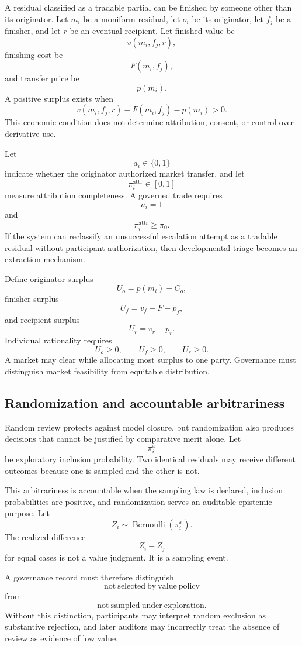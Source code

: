 \documentclass[11pt]{article}
\theoremstyle{definition}
\begin{document}
A residual classified as a tradable partial can be finished by someone other than its originator. Let \(m_i\) be a moniform residual, let \(o_i\) be its originator, let \(f_j\) be a finisher, and let \(r\) be an eventual recipient. Let finished value be
\[
v(m_i,f_j,r),
\]
finishing cost be
\[
F(m_i,f_j),
\]
and transfer price be
\[
p(m_i).
\]
A positive surplus exists when
\[
v(m_i,f_j,r)-F(m_i,f_j)-p(m_i)>0.
\]
This economic condition does not determine attribution, consent, or control over derivative use.

Let
\[
a_i\in\{0,1\}
\]
indicate whether the originator authorized market transfer, and let
\[
\pi_i^{\mathrm{attr}}\in[0,1]
\]
measure attribution completeness. A governed trade requires
\[
a_i=1
\]
and
\[
\pi_i^{\mathrm{attr}}\geq\pi_0.
\]
If the system can reclassify an unsuccessful escalation attempt as a tradable residual without participant authorization, then developmental triage becomes an extraction mechanism.

Define originator surplus
\[
U_o=p(m_i)-C_o,
\]
finisher surplus
\[
U_f=v_f-F-p_f,
\]
and recipient surplus
\[
U_r=v_r-p_r.
\]
Individual rationality requires
\[
U_o\geq0,
\qquad
U_f\geq0,
\qquad
U_r\geq0.
\]
A market may clear while allocating most surplus to one party. Governance must distinguish market feasibility from equitable distribution.

\subsection{Randomization and accountable arbitrariness}

Random review protects against model closure, but randomization also produces decisions that cannot be justified by comparative merit alone. Let
\[
\pi_i^{x}
\]
be exploratory inclusion probability. Two identical residuals may receive different outcomes because one is sampled and the other is not.

This arbitrariness is accountable when the sampling law is declared, inclusion probabilities are positive, and randomization serves an auditable epistemic purpose. Let
\[
Z_i\sim\operatorname{Bernoulli}(\pi_i^{x}).
\]
The realized difference
\[
Z_i-Z_j
\]
for equal cases is not a value judgment. It is a sampling event.

A governance record must therefore distinguish
\[
\mathrm{not\ selected\ by\ value\ policy}
\]
from
\[
\mathrm{not\ sampled\ under\ exploration}.
\]
Without this distinction, participants may interpret random exclusion as substantive rejection, and later auditors may incorrectly treat the absence of review as evidence of low value.
\end{document}

